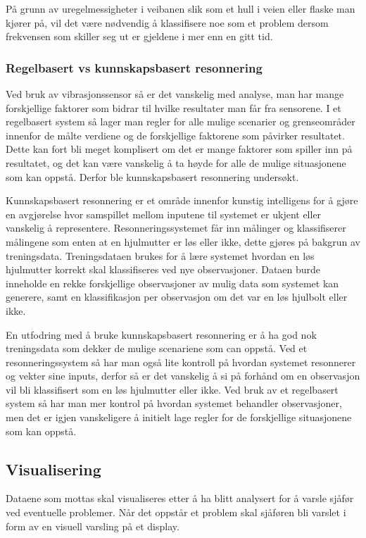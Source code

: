 På grunn av uregelmessigheter i veibanen slik som et hull i veien eller flaske 
man kjører på, vil det være nødvendig å klassifisere noe som et problem dersom 
frekvensen som skiller seg ut er gjeldene i mer enn en gitt tid.

\subsubsection{Regelbasert vs kunnskapsbasert resonnering}
Ved bruk av vibrasjonssensor så er det vanskelig med analyse, man har mange 
forskjellige faktorer som bidrar til hvilke resultater man får fra sensorene.
I et regelbasert system så lager man regler for alle mulige scenarier og 
grenseområder innenfor de målte verdiene og de forskjellige faktorene som 
påvirker resultatet. Dette kan fort bli meget komplisert om det er mange faktorer 
som spiller inn på resultatet, og det kan være vanskelig å ta høyde for alle de 
mulige situasjonene som kan oppstå. Derfor ble kunnskapsbasert resonnering undersøkt. 

Kunnskapsbasert resonnering er et område innenfor kunstig intelligens for å gjøre 
en avgjørelse hvor samspillet mellom inputene til systemet er ukjent eller vanskelig 
å representere. Resonneringssystemet får inn målinger og klassifiserer målingene 
som enten at en hjulmutter er løs eller ikke, dette gjøres på bakgrun av treningsdata. 
Treningsdataen brukes for å lære systemet hvordan en løs hjulmutter korrekt skal 
klassifiseres ved nye observasjoner. Dataen burde inneholde en rekke forskjellige 
observasjoner av mulig data som systemet kan generere, samt en klassifikasjon per 
observasjon om det var en løs hjulbolt eller ikke.

En utfodring med å bruke kunnskapsbasert resonnering er å ha god nok treningsdata 
som dekker de mulige scenariene som can oppstå. Ved et resonneringssystem så har 
man også lite kontroll på hvordan systemet resonnerer og vekter sine inputs, derfor 
så er det vanskelig å si på forhånd om en observasjon vil bli klassifisert som en løs 
hjulmutter eller ikke. Ved bruk av et regelbasert system så har man mer kontrol på 
hvordan systemet behandler observasjoner, men det er igjen vanskeligere å initielt 
lage regler for de forskjellige situasjonene som kan oppstå.

\subsection{Visualisering}
Dataene som mottas skal visualiseres etter å ha blitt analysert for å varsle 
sjåfør ved eventuelle problemer. Når det oppstår et problem skal sjåføren bli 
varslet i form av en visuell varsling på et display.

